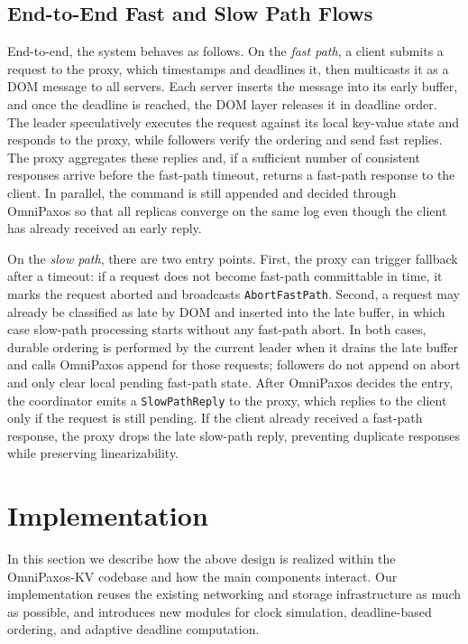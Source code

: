 \documentclass{article}
\begin{document}
\subsection{End-to-End Fast and Slow Path Flows}
End-to-end, the system behaves as follows. On the \emph{fast path}, a client submits a request to the proxy, which timestamps and deadlines it, then multicasts it as a DOM message to all servers. Each server inserts the message into its early buffer, and once the deadline is reached, the DOM layer releases it in deadline order. The leader speculatively executes the request against its local key-value state and responds to the proxy, while followers verify the ordering and send fast replies. The proxy aggregates these replies and, if a sufficient number of consistent responses arrive before the fast-path timeout, returns a fast-path response to the client. In parallel, the command is still appended and decided through OmniPaxos so that all replicas converge on the same log even though the client has already received an early reply.

On the \emph{slow path}, there are two entry points. First, the proxy can trigger fallback after a timeout: if a request does not become fast-path committable in time, it marks the request aborted and broadcasts \texttt{AbortFastPath}. Second, a request may already be classified as late by DOM and inserted into the late buffer, in which case slow-path processing starts without any fast-path abort. In both cases, durable ordering is performed by the current leader when it drains the late buffer and calls OmniPaxos append for those requests; followers do not append on abort and only clear local pending fast-path state. After OmniPaxos decides the entry, the coordinator emits a \texttt{SlowPathReply} to the proxy, which replies to the client only if the request is still pending. If the client already received a fast-path response, the proxy drops the late slow-path reply, preventing duplicate responses while preserving linearizability.

\section{Implementation}
In this section we describe how the above design is realized within the OmniPaxos-KV codebase and how the main components interact. Our implementation reuses the existing networking and storage infrastructure as much as possible, and introduces new modules for clock simulation, deadline-based ordering, and adaptive deadline computation.
\end{document}
